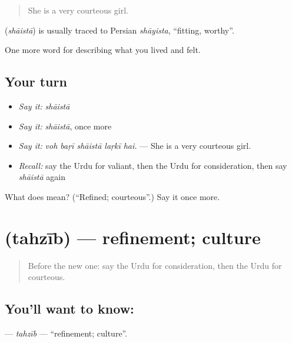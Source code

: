 \begin{quote}
She is a very courteous girl.
\end{quote}

\begin{cousinweb}
\textbf{} (\emph{shāistā}) is usually traced to Persian \emph{shāyista}, \textquotedblleft{}fitting, worthy\textquotedblright{}.
\end{cousinweb}

\begin{grammarlens}[title={What you've built}]
One more word for describing what you lived and felt.
\end{grammarlens}

\subsection*{Your turn}
\begin{itemize}
\raggedright
  \item \emph{Say it:} \emph{shāistā}
  \item \emph{Say it:} \emph{shāistā}, once more
  \item \emph{Say it:} \emph{voh baṛī shāistā laṛkī hai.} — She is a very courteous girl.
  \item \emph{Recall:} say the Urdu for valiant, then the Urdu for consideration, then say \emph{shāistā} again
\end{itemize}

\begin{tcolorbox}[breakable,colback=teal!4,colframe=teal!35!black,title={Before you move on}]
What does  mean? (\textquotedblleft{}Refined; courteous\textquotedblright{}.) Say it once more.
\end{tcolorbox}
\section[\texorpdfstring{\ur{تہذیب} (tahzīb)}{تہذیب (tahzīb)}]{ (tahzīb) — refinement; culture}

\label{lesson:UR-C461-tahzib}



\begin{quote}
Before the new one: say the Urdu for consideration, then the Urdu for courteous.
\end{quote}

\subsection*{You'll want to know: }
\textbf{} — \emph{tahzīb} — \textquotedblleft{}refinement; culture\textquotedblright{}.

